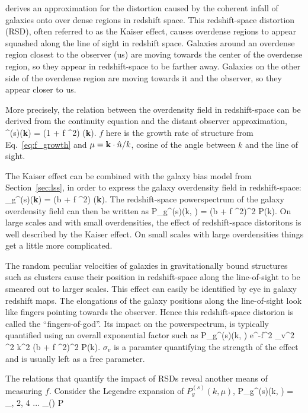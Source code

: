  derives an approximation for the distortion caused by the coherent 
infall of galaxies onto over dense regions in redshift space. This redshift-space 
distortion (RSD), often referred to as the Kaiser effect, causes overdense regions
to appear squashed along the line of sight in redshift space. Galaxies around an
overdense region closest to the observer (us) are moving towards the center of the 
overdense region, so they appear in redshift-space to be farther away. Galaxies 
on the other side of the overdense region are moving towards it and the observer, 
so they appear closer to us. 

More precisely, the relation between the overdensity field in redshift-space can be 
derived from the continuity equation and the distant observer approximation, 
\beq
\delta^{(s)}({\bf k}) = (1 + f \mu^2) \delta({\bf k}).
\eeq
$f$ here is the growth rate of structure from Eq.~\ref{eq:f_growth} and 
$\mu = {\bf k} \cdot \hat{n} / k$, cosine of the angle between $k$ and 
the line of sight. 

The Kaiser effect can be combined with the galaxy bias model from 
Section~\ref{sec:lss}, in order to express the galaxy overdensity field in 
redshift-space:
\beq
\delta_g^{(s)}({\bf k}) = (b + f \mu^2) \delta({\bf k}).
\eeq
The redshift-space powerspectrum of the galaxy overdensity field can then be
written as 
\beq
P_g^{(s)}(k, \mu) = (b + f \mu^2)^2 P(k).
\eeq
On large scales and with small overdensities, the effect of redshift-space 
distoritons is well described by the Kaiser effect. On small scales with large
overdensities things get a little more complicated. 

The random peculiar velocities of galaxies in gravitationally bound structures 
such as clusters cause their position in redshift-space along the line-of-sight 
to be smeared out to larger scales.  This effect can easily be identified by 
eye in galaxy redshift maps. The elongations of the galaxy positions along the 
line-of-sight look like fingers pointing towards the observer. Hence this 
redshift-space distorion is called the ``fingers-of-god''. Its impact on the 
powerspectrum, is typically quantified using an overall exponential factor such as 
\beq
P_g^{(s)}(k, \mu) \approx e^{-f^2 \sigma_v^2 \mu^2 k^2} (b + f \mu^2)^2 P(k).
\eeq
$\sigma_v$ is a paramter quantifying the strength of the effect and is usually
left as a free parameter. 

The relations that quantify the impact of RSDs reveal another means of measuring 
$f$. Consider the Legendre expansion of $P_g^{(s)}(k, \mu)$, 
\beq
P_g^{(s)}(k, \mu) = \sum\limits_{, 2, 4 ...} _\ell(\mu) P
\eeq


